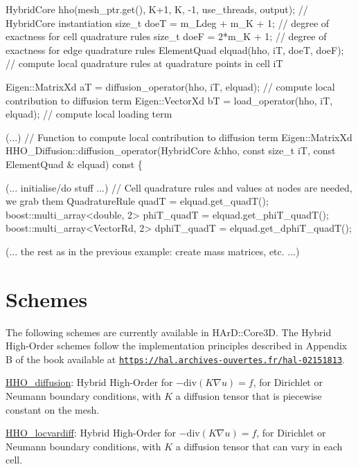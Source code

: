 \begin{DoxyCode}
HybridCore hho(mesh\_ptr.get(), K+1, K, -1, use\_threads, output);    \textcolor{comment}{// HybridCore instantiation}
\textcolor{keywordtype}{size\_t} doeT = m\_Ldeg + m\_K + 1;     \textcolor{comment}{// degree of exactness for cell quadrature rules}
\textcolor{keywordtype}{size\_t} doeF = 2*m\_K + 1;            \textcolor{comment}{// degree of exactness for edge quadrature rules}
ElementQuad elquad(hho, iT, doeT, doeF);  \textcolor{comment}{// compute local quadrature rules at quadrature points in cell iT}

Eigen::MatrixXd aT = diffusion\_operator(hho, iT, elquad);       \textcolor{comment}{// compute local contribution to diffusion
       term}
Eigen::VectorXd bT = load\_operator(hho, iT, elquad);        \textcolor{comment}{//  compute local loading term}

(...)
\textcolor{comment}{// Function to compute local contribution to diffusion term}
Eigen::MatrixXd HHO\_Diffusion::diffusion\_operator(HybridCore &hho, \textcolor{keyword}{const} \textcolor{keywordtype}{size\_t} iT, \textcolor{keyword}{const} ElementQuad &
      elquad)\textcolor{keyword}{ const }\{

(... initialise/\textcolor{keywordflow}{do} stuff ...)
\textcolor{comment}{// Cell quadrature rules and values at nodes are needed, we grab them}
QuadratureRule quadT = elquad.get\_quadT();
boost::multi\_array<double, 2> phiT\_quadT = elquad.get\_phiT\_quadT();
boost::multi\_array<VectorRd, 2> dphiT\_quadT = elquad.get\_dphiT\_quadT();

(... the rest as in the previous example: create mass matrices, etc. ...)
\end{DoxyCode}


\label{_schemes}%
 \hypertarget{index_schemes}{}\section{Schemes}\label{index_schemes}
The following schemes are currently available in H\+Ar\+D\+::\+Core3D. The Hybrid High-\/\+Order schemes follow the implementation principles described in Appendix B of the book available at \href{https://hal.archives-ouvertes.fr/hal-02151813}{\tt https\+://hal.\+archives-\/ouvertes.\+fr/hal-\/02151813}.


\begin{DoxyItemize}
\item \hyperlink{classHArDCore3D_1_1HHO__Diffusion}{H\+H\+O\+\_\+diffusion}\+: Hybrid High-\/\+Order for $-\mathrm{div}(K\nabla u)=f$, for Dirichlet or Neumann boundary conditions, with $K$ a diffusion tensor that is piecewise constant on the mesh.
\item \hyperlink{classHArDCore3D_1_1HHO__LocVarDiff}{H\+H\+O\+\_\+locvardiff}\+: Hybrid High-\/\+Order for $-\mathrm{div}(K\nabla u)=f$, for Dirichlet or Neumann boundary conditions, with $K$ a diffusion tensor that can vary in each cell.
\end{DoxyItemize}

